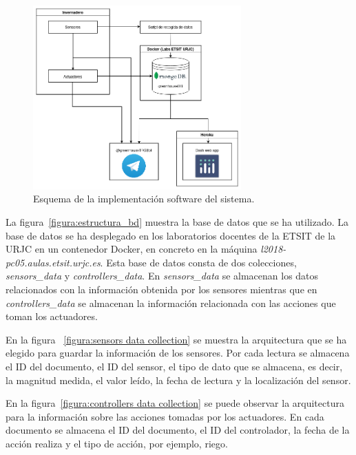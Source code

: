 \documentclass[a4paper, 12pt, oneside]{book}
\begin{document}
\begin{figure}[H]
	\centering
    \includegraphics[width=8cm, keepaspectratio]{img/esquema_general_software}
    \caption{Esquema de la implementación software del sistema.}
    \label{figura:esquema_general_software}
\end{figure}

La figura~\ref{figura:estructura_bd} muestra la base de datos que se ha utilizado. La base de datos se ha desplegado en los laboratorios docentes de la ETSIT de la URJC en un contenedor Docker, en concreto en la máquina \textit{l2018-pc05.aulas.etsit.urjc.es}. Esta base de datos consta de dos colecciones, \textit{sensors\_data} y \textit{controllers\_data}. En \textit{sensors\_data} se almacenan los datos relacionados con la información obtenida por los sensores mientras que en \textit{controllers\_data} se almacenan la información relacionada con las acciones que toman los actuadores.

En la figura ~\ref{figura:sensors data collection} se muestra la arquitectura que se ha elegido para guardar la información de los sensores. Por cada lectura se almacena el ID del documento, el ID del sensor, el tipo de dato que se almacena, es decir, la magnitud medida, el valor leído, la fecha de lectura y la localización del sensor.

En la figura~\ref{figura:controllers data collection} se puede observar la arquitectura para la información sobre las acciones tomadas por los actuadores. En cada documento se almacena el ID del documento, el ID del controlador, la fecha de la acción realiza y el tipo de acción, por ejemplo, riego.
\end{document}
